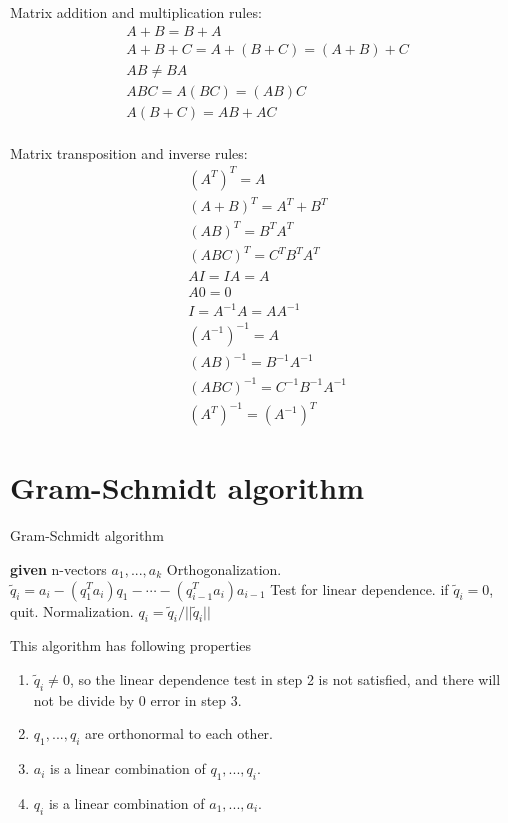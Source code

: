 \documentclass{article}
\begin{document}
\begin{multicols}{2}
    
\noindent

    Matrix addition and multiplication rules:
\begin{align}
    & A+B = B+A \\
    & A+B+C = A+(B+C) = (A+B)+C \\
    & AB \ne BA \\
    & ABC=A(BC)=(AB)C \\
    & A(B+C) = AB+ AC \\
\end{align}
\vspace{\fill}

\columnbreak

Matrix transposition and inverse rules:
\begin{align}
    & (A^T)^T = A \\
    & (A+B)^T = A^T+B^T \\
    & (AB)^T = B^T A^T \\
    & (ABC)^T = C^T B^T A^T  \\
    &  AI = IA = A \\
    &  A0 = 0 \\
    &  I = A^{-1} A = A A^{-1} \\
    &  (A^{-1})^{-1} = A \\
    &  (AB)^{-1} = B^{-1} A^{-1}\\
    &  (ABC)^{-1} = C^{-1} B^{-1} A^{-1} \\
    &  (A^T)^{-1} = (A^{-1})^T 
\end{align}
\end{multicols}


\section{Gram-Schmidt algorithm}

\begin{algorithm}
    \caption{Gram-Schmidt algorithm}
    \begin{algorithmic}
        \State \textbf{given} n-vectors $a_1,...,a_k$
        \State Orthogonalization. $\tilde{q}_i = a_i - (q_1^T a_i) q_1 - \cdots - (q_{i-1}^T a_i) a_{i-1} $
        \State Test for linear dependence. if $\tilde{q}_i = 0$, quit.
        \State Normalization. $q_i = \tilde{q}_i / ||\tilde{q}_i||$
        \EndFor
    \end{algorithmic}
\end{algorithm}

This algorithm has following properties
\begin{enumerate}
    \item $\tilde{q}_i \ne 0$, so the linear dependence test in step 2 is not satisfied, and there will not be divide by 0 error in step 3.
    \item $q_1,...,q_i$ are orthonormal to each other.
    \item $a_i$ is a linear combination of $q_1,...,q_i$.
    \item $q_i$ is a linear combination of $a_1,...,a_i$.
\end{enumerate}
\end{document}
